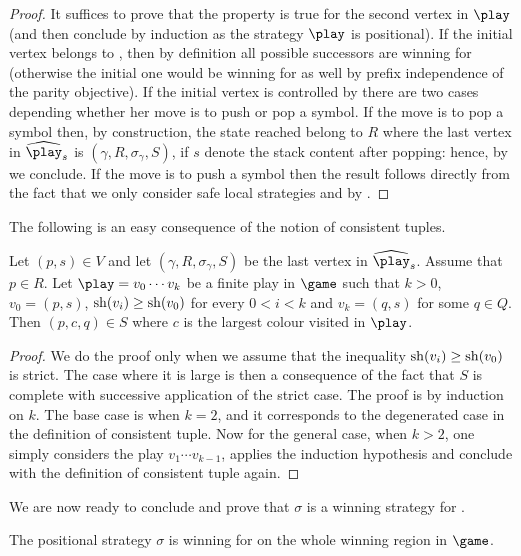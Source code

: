 \begin{proof}
	It suffices to prove that the property is true for the second vertex in $\play$ (and then conclude by induction as the strategy $\play$ is positional). If the initial vertex belongs to \Adam, then by definition all possible successors are winning for \Eve (otherwise the initial one would be winning for \Adam as well by prefix independence of the parity objective). If the initial vertex is controlled by \Eve there are two cases depending whether her move is to push or pop a symbol. If the move is to pop a symbol then, by construction, the state reached belong to $R$ where the last vertex in $\hplay_s$ is $(\gamma,R,\sigma_\gamma,S)$, if $s$ denote the stack content after popping: hence, by  we conclude. If the move is to push a symbol then the result follows directly from the fact that we only consider safe local strategies and by .
\end{proof}

The following is an easy consequence of the notion of consistent tuples.

\begin{proposition}\label{11-proposition:bumps}
Let $(p,s)\in V$ and let $(\gamma,R,\sigma_\gamma,S)$ be the last vertex in $\hplay_s$. Assume that $p\in R$. Let $\play=v_0\cdots v_k$ be a finite play in $\game$ such that $k> 0$, $v_0=(p,s)$, $\mathrm{sh}(v_i)\geq\mathrm{sh}(v_0)$ for every $0< i< k$ and $v_k=(q,s)$ for some $q\in Q$. Then $(p,c,q)\in S$ where $c$ is the largest colour visited in $\play$. 
\end{proposition}

\begin{proof}
	We do the proof only when we assume that the inequality $\mathrm{sh}(v_i)\geq\mathrm{sh}(v_0)$ is strict. The case where it is large is then a consequence of the fact that $S$ is complete with successive application of the strict case.
	The proof is by induction on $k$. The base case is when $k=2$, and it corresponds to the degenerated case in the definition of consistent tuple. Now for the general case, when $k>2$, one simply considers the play $v_1\cdots v_{k-1}$, applies the induction hypothesis and conclude with the definition of consistent tuple again.
\end{proof}

We are now ready to conclude and prove that $\sigma$ is a winning strategy for \Eve.

\begin{theorem}\label{11-thm:positional-strategy}
	The positional strategy $\sigma$ is winning for \Eve on the whole winning region in $\game$.
\end{theorem}

